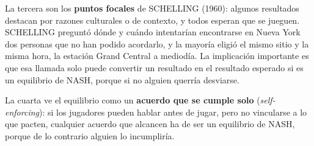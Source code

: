 \documentclass[10pt,a4paper]{article}
\begin{document}
La tercera son los \textbf{puntos focales} de SCHELLING (1960): algunos resultados destacan por razones culturales o de contexto, y todos esperan que se jueguen. SCHELLING preguntó dónde y cuándo intentarían encontrarse en Nueva York dos personas que no han podido acordarlo, y la mayoría eligió el mismo sitio y la misma hora, la estación Grand Central a mediodía. La implicación importante es que esa llamada solo puede convertir un resultado en el resultado esperado si es un equilibrio de NASH, porque si no alguien querría desviarse.

La cuarta ve el equilibrio como un \textbf{acuerdo que se cumple solo} (\textit{self-enforcing}): si los jugadores pueden hablar antes de jugar, pero no vincularse a lo que pacten, cualquier acuerdo que alcancen ha de ser un equilibrio de NASH, porque de lo contrario alguien lo incumpliría.
\end{document}
